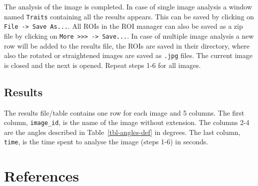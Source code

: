 \documentclass[
  letterpaper,
  DIV=11,
  numbers=noendperiod,
  oneside]{scrreprt}
\begin{document}
The analysis of the image is completed. In case of single image analysis
a window named \texttt{Traits} containing all the results appears. This
can be saved by clicking on \texttt{File\ -\textgreater{}\ Save\ As...}.
All ROIs in the ROI manager can also be saved as a zip file by clicking
on
\texttt{More\ \textgreater{}\textgreater{}\textgreater{}\ -\textgreater{}\ Save...}.
In case of multiple image analysis a new row will be added to the
results file, the ROIs are saved in their directory, where also the
rotated or straightened images are saved as \texttt{.jpg} files. The
current image is closed and the next is opened. Repeat steps 1-6 for all
images.

\hypertarget{results-1}{%
\section{Results}\label{results-1}}

The results file/table contains one row for each image and 5 columns.
The first column, \texttt{image\_id}, is the name of the image without
extension. The columns 2-4 are the angles described in
Table~\ref{tbl-angles-def} in degrees. The last column, \texttt{time},
is the time spent to analyse the image (steps 1-6) in seconds.

\hypertarget{references}{%
\chapter*{References}\label{references}}
\end{document}
